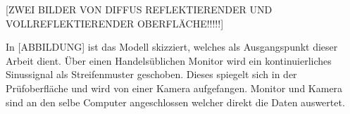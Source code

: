 [ZWEI BILDER VON DIFFUS REFLEKTIERENDER UND VOLLREFLEKTIERENDER OBERFLÄCHE!!!!!]

In [ABBILDUNG] ist das Modell skizziert, welches als Ausgangspunkt dieser Arbeit dient. Über einen Handelsüblichen Monitor wird ein kontinuierliches Sinussignal als Streifenmuster geschoben. Dieses spiegelt sich in der Prüfoberfläche und wird von einer Kamera aufgefangen. Monitor und Kamera sind an den selbe Computer angeschlossen welcher direkt die Daten auswertet. 
